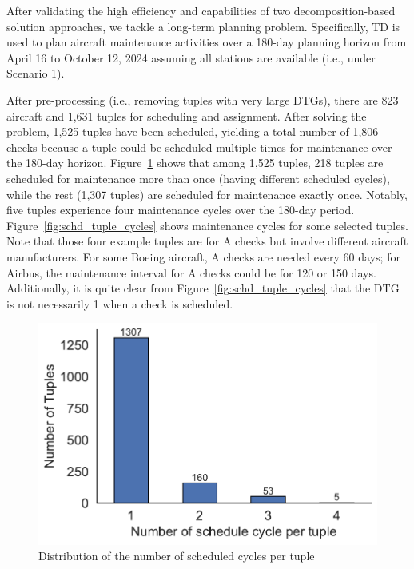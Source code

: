After validating the high efficiency and capabilities of two decomposition-based solution approaches, we tackle a long-term planning problem. Specifically, TD is used to plan aircraft maintenance activities over a 180-day planning horizon from April 16 to October 12, 2024 assuming all stations are available (i.e., under Scenario 1). 

After pre-processing (i.e., removing tuples with very large DTGs), there are 823 aircraft and 1,631 tuples for scheduling and assignment. After solving the problem, 1,525 tuples have been scheduled, yielding a total number of 1,806 checks because a tuple could be scheduled multiple times for maintenance over the 180-day horizon. Figure~\ref{fig:schd_pertuple} shows that among 1,525 tuples, 218 tuples are scheduled for maintenance more than once (having different scheduled cycles), while the rest (1,307 tuples) are scheduled for maintenance exactly once. Notably, five tuples experience four maintenance cycles over the 180-day period. Figure~\ref{fig:schd_tuple_cycles} shows maintenance cycles for some selected tuples. Note that those four example tuples are for A checks but involve different aircraft manufacturers. For some Boeing aircraft, A checks are needed every 60 days; for Airbus, the maintenance interval for A checks could be for 120 or 150 days. Additionally, it is quite clear from Figure~\ref{fig:schd_tuple_cycles} that the DTG is not necessarily 1 when a check is scheduled.


\begin{figure}[htbp]
    \centering
    \includegraphics[width=0.5\linewidth]{Num_per_tuples.pdf}
    \caption{Distribution of the number of scheduled cycles per tuple}
    \label{fig:schd_pertuple}
\end{figure}

